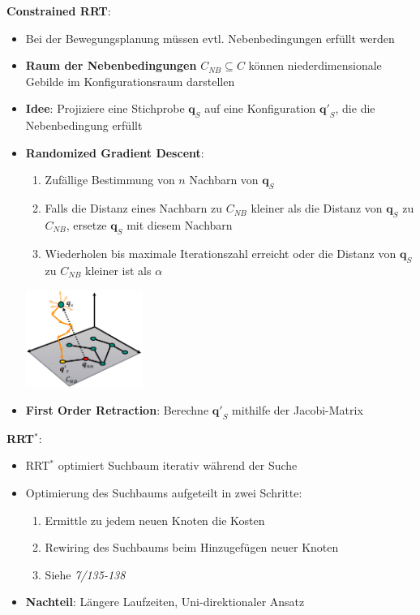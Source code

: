 \bigskip
\textbf{Constrained RRT}:
\begin{itemize}
	\item Bei der Bewegungsplanung müssen evtl. Nebenbedingungen erfüllt werden
	\item \textbf{Raum der Nebenbedingungen} $C_{NB}\subseteq C$ können niederdimensionale Gebilde im Konfigurationsraum darstellen
	\item \textbf{Idee}: Projiziere eine Stichprobe $\mathbf{q}_S$ auf eine Konfiguration $\mathbf{q'}_S$, die die Nebenbedingung erfüllt
	\pagebreak
	
	\item \textbf{Randomized Gradient Descent}:
	\begin{enumerate}
		\item Zufällige Bestimmung von $n$ Nachbarn von $\mathbf{q}_S$
		\item Falls die Distanz eines Nachbarn zu $C_{NB}$ kleiner als die Distanz von $\mathbf{q}_S$ zu $C_{NB}$, ersetze $\mathbf{q}_S$ mit diesem Nachbarn
		\item Wiederholen bis maximale Iterationszahl erreicht oder die Distanz von $\mathbf{q}_S$ zu $C_{NB}$ kleiner ist als $\alpha$
	\end{enumerate}
	\begin{center}
		\includegraphics[width=0.3\textwidth]{images/rgd.png}
	\end{center}
	\item \textbf{First Order Retraction}: Berechne $\mathbf{q'}_S$ mithilfe der Jacobi-Matrix
\end{itemize}
\bigskip
\textbf{RRT$\boldsymbol{^*}$}: 
\begin{itemize}
	\item RRT$^*$ optimiert Suchbaum iterativ während der Suche
	\item Optimierung des Suchbaums aufgeteilt in zwei Schritte:
	\begin{enumerate}
		\item Ermittle zu jedem neuen Knoten die Kosten 
		\item Rewiring des Suchbaums beim Hinzugefügen neuer Knoten
		\item Siehe \textit{7/135-138}
	\end{enumerate}
	\item \textbf{Nachteil}: Längere Laufzeiten, Uni-direktionaler Ansatz
\end{itemize}
